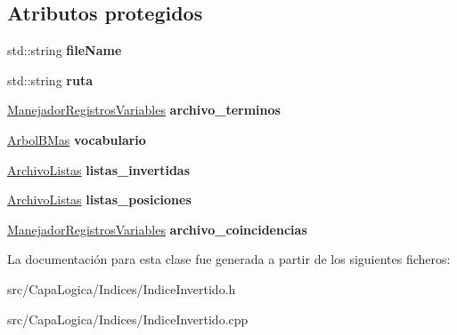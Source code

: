 \subsection*{\-Atributos protegidos}
\begin{DoxyCompactItemize}
\item 
\hypertarget{class_indice_invertido_a7667a496c70b0cb136e9fda950e04ab6}{std\-::string {\bfseries file\-Name}}\label{class_indice_invertido_a7667a496c70b0cb136e9fda950e04ab6}

\item 
\hypertarget{class_indice_invertido_af4af28529fee83ce443a3cdc13fa5db6}{std\-::string {\bfseries ruta}}\label{class_indice_invertido_af4af28529fee83ce443a3cdc13fa5db6}

\item 
\hypertarget{class_indice_invertido_a4cda62da0617ab6705223394c6437d65}{\hyperlink{class_manejador_registros_variables}{\-Manejador\-Registros\-Variables} {\bfseries archivo\-\_\-terminos}}\label{class_indice_invertido_a4cda62da0617ab6705223394c6437d65}

\item 
\hypertarget{class_indice_invertido_a485a47f2343d72a3644c73b7c3aa852a}{\hyperlink{class_arbol_b_mas}{\-Arbol\-B\-Mas} {\bfseries vocabulario}}\label{class_indice_invertido_a485a47f2343d72a3644c73b7c3aa852a}

\item 
\hypertarget{class_indice_invertido_afa3e74ad9f09bfd672acf33dfce81140}{\hyperlink{class_archivo_listas}{\-Archivo\-Listas} {\bfseries listas\-\_\-invertidas}}\label{class_indice_invertido_afa3e74ad9f09bfd672acf33dfce81140}

\item 
\hypertarget{class_indice_invertido_adac46344d89a333eba12252070e56223}{\hyperlink{class_archivo_listas}{\-Archivo\-Listas} {\bfseries listas\-\_\-posiciones}}\label{class_indice_invertido_adac46344d89a333eba12252070e56223}

\item 
\hypertarget{class_indice_invertido_a33806669bedcfc43ca5ff820e8aac761}{\hyperlink{class_manejador_registros_variables}{\-Manejador\-Registros\-Variables} {\bfseries archivo\-\_\-coincidencias}}\label{class_indice_invertido_a33806669bedcfc43ca5ff820e8aac761}

\end{DoxyCompactItemize}


\-La documentación para esta clase fue generada a partir de los siguientes ficheros\-:\begin{DoxyCompactItemize}
\item 
src/\-Capa\-Logica/\-Indices/\-Indice\-Invertido.\-h\item 
src/\-Capa\-Logica/\-Indices/\-Indice\-Invertido.\-cpp\end{DoxyCompactItemize}
